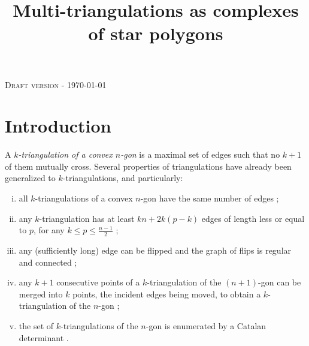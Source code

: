 \documentclass[12pt]{amsart}
\begin{document}
 

\newtheorem{theorem}{Theorem}
\newtheorem{proposition}{Proposition}
\newtheorem{lemma}{Lemma}
\newtheorem{corollary}{Corollary}
\newtheorem{definition}{Definition}
\newenvironment{remark}{\medskip\noindent{\textbf{Remark.}}}{\medskip}
\newenvironment{example}{\medskip\noindent{\textbf{Example.}}}{\medskip}

\newcommand{\cl}{\ensuremath{\prec}}
\newcommand{\cle}{\ensuremath{\preccurlyeq}}

\makeatletter
\newlength{\earraycolsep}
\setlength{\earraycolsep}{2pt}
\def\eqnarray{\stepcounter{equation}\let\@currentlabel%
\theequation
\global\@eqnswtrue\m@th
\global\@eqcnt\z@\tabskip\@centering\let\\\@eqncr
$$\halign to\displaywidth\bgroup\@eqnsel\hskip\@centering
$\displaystyle\tabskip\z@{##}$&\global\@eqcnt\@ne
\hskip 2\earraycolsep \hfil$\displaystyle{##}$\hfil
&\global\@eqcnt\tw@ \hskip 2\earraycolsep
$\displaystyle\tabskip\z@{##}$\hfil
\tabskip\@centering&\llap{##}\tabskip\z@\cr}
\makeatother

\title{Multi-triangulations as complexes of star polygons}
\maketitle

\begin{center}
\textsc{Draft version} - \today
\end{center}

\section{Introduction}\label{sectionintroduction}

A \emph{$k$-triangulation of a convex $n$-gon} is a maximal set of edges such that no $k+1$ of them mutually cross. Several properties of triangulations have already been generalized to $k$-triangulations, and particularly: 
\begin{enumerate}[(i)]
\item all $k$-triangulations of a convex $n$-gon have the same number of edges \cite{cp-tttccp-92,n-gdfcp-00,dkm-lahp-02};
\item any $k$-triangulation has at least $kn+2k(p-k)$ edges of length less or equal to $p$, for any $k\le p\le \frac{n-1}{2}$ \cite{n-gdfcp-00};
\item any (sufficiently long) edge can be flipped and the graph of flips is regular and connected \cite{n-gdfcp-00,dkm-lahp-02};
\item any $k+1$ consecutive points of a $k$-triangulation of the $(n+1)$-gon can be merged into $k$ points, the incident edges being moved, to obtain a $k$-triangulation of the $n$-gon \cite{n-gdfcp-00,j-gt-03};
\item the set of $k$-triangulations of the $n$-gon is enumerated by a Catalan determinant \cite{j-gt-03,j-gtdfssp-05}.
\end{enumerate}
\end{document}
